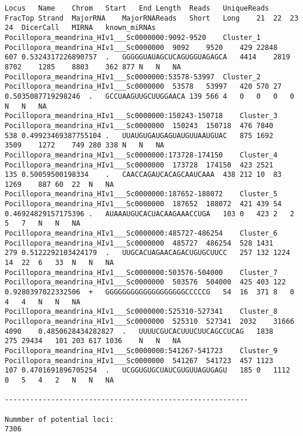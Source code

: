 \documentclass[
]{article}
\begin{document}
\begin{verbatim}
Locus   Name    Chrom   Start   End Length  Reads   UniqueReads FracTop Strand  MajorRNA    MajorRNAReads   Short   Long    21  22  23  24  DicerCall   MIRNA   known_miRNAs
Pocillopora_meandrina_HIv1___Sc0000000:9092-9520    Cluster_1   Pocillopora_meandrina_HIv1___Sc0000000  9092    9520    429 22848   607 0.5324317226890757  .   GGGGGUAUAGCUCAGUGGUAGAGCA   4414    2819    8702    1285    8803    362 877 N   N   NA
Pocillopora_meandrina_HIv1___Sc0000000:53578-53997  Cluster_2   Pocillopora_meandrina_HIv1___Sc0000000  53578   53997   420 570 27  0.5035087719298246  .   GCCUAAGUUGCUUGGAACA 139 566 4   0   0   0   0   N   N   NA
Pocillopora_meandrina_HIv1___Sc0000000:150243-150718    Cluster_3   Pocillopora_meandrina_HIv1___Sc0000000  150243  150718  476 7840    538 0.49923469387755104 .   UUAUGUGAUGAGUAUGUUAAUGUAC   875 1692    3509    1272    749 280 338 N   N   NA
Pocillopora_meandrina_HIv1___Sc0000000:173728-174150    Cluster_4   Pocillopora_meandrina_HIv1___Sc0000000  173728  174150  423 2521    135 0.50059500198334    .   CAACCAGAUCACAGCAAUCAAA  438 212 10  83  1269    887 60  22  N   NA
Pocillopora_meandrina_HIv1___Sc0000000:187652-188072    Cluster_5   Pocillopora_meandrina_HIv1___Sc0000000  187652  188072  421 439 54  0.46924829157175396 .   AUAAAUGUCACUACAAGAAACCUGA   103 0   423 2   2   5   7   N   N   NA
Pocillopora_meandrina_HIv1___Sc0000000:485727-486254    Cluster_6   Pocillopora_meandrina_HIv1___Sc0000000  485727  486254  528 1431    279 0.5122292103424179  .   UUGCACUAGAACAGACUGUGCUUCC   257 132 1224    14  22  6   33  N   N   NA
Pocillopora_meandrina_HIv1___Sc0000000:503576-504000    Cluster_7   Pocillopora_meandrina_HIv1___Sc0000000  503576  504000  425 403 122 0.9280397022332506  +   GGGGGGGGGGGGGGGGGGGCCCCCG   54  16  371 8   0   4   4   N   N   NA
Pocillopora_meandrina_HIv1___Sc0000000:525310-527341    Cluster_8   Pocillopora_meandrina_HIv1___Sc0000000  525310  527341  2032    31666   4090    0.4850628434282827  .   UUUUCGUCACUUUCUUCAGCCUCAG   1838    275 29434   101 203 617 1036    N   N   NA
Pocillopora_meandrina_HIv1___Sc0000000:541267-541723    Cluster_9   Pocillopora_meandrina_HIv1___Sc0000000  541267  541723  457 1123    107 0.4701691896705254  .   UCGGUGUGCUAUCGUGUUAGUGAGU   185 0   1112    0   5   4   2   N   N   NA

----------------------------------------------------------

Nummber of potential loci:
7306
\end{verbatim}
\end{document}
